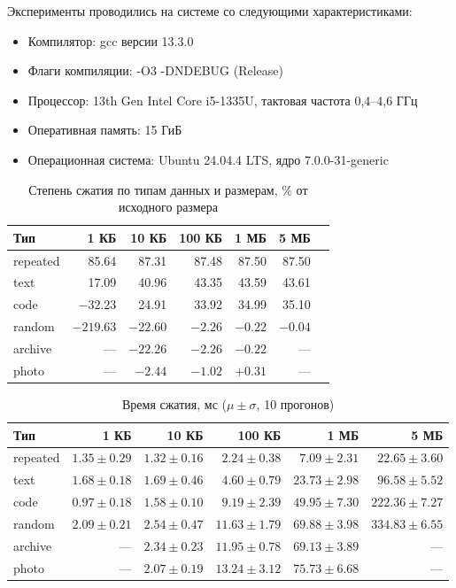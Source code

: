 \documentclass[a4paper]{article}
\begin{document}
Эксперименты проводились на системе со следующими характеристиками:

\begin{itemize}
    \item Компилятор: gcc версии 13.3.0
    \item Флаги компиляции: -O3 -DNDEBUG (Release)
    \item Процессор: 13th Gen Intel Core i5-1335U, тактовая частота 0,4--4,6 ГГц
    \item Оперативная память: 15 ГиБ
    \item Операционная система: Ubuntu 24.04.4 LTS, ядро 7.0.0-31-generic
\end{itemize}

\begin{table}[h]
\centering
\small
\caption{Степень сжатия по типам данных и размерам, \% от исходного размера}
\label{tab:ratio}
\begin{tabular}{lrrrrrr}
\toprule
Тип & 1 КБ & 10 КБ & 100 КБ & 1 МБ & 5 МБ \\
\midrule
repeated & 85.64 & 87.31 & 87.48 & 87.50 & 87.50 \\
text     & 17.09 & 40.96 & 43.35 & 43.59 & 43.61 \\
code     & $-32.23$ & 24.91 & 33.92 & 34.99 & 35.10 \\
random   & $-219.63$ & $-22.60$ & $-2.26$ & $-0.22$ & $-0.04$ \\
archive  & ---   & $-22.26$ & $-2.26$ & $-0.22$ & ---   \\
photo    & ---   & $-2.44$  & $-1.02$ & $+0.31$ & ---   \\
\bottomrule
\end{tabular}
\end{table}

\begin{table}[h]
\centering
\small
\caption{Время сжатия, мс ($\mu \pm \sigma$, 10 прогонов)}
\label{tab:compress}
\begin{tabular}{lrrrrr}
\toprule
Тип & 1 КБ & 10 КБ & 100 КБ & 1 МБ & 5 МБ \\
\midrule
repeated & $1.35 \pm 0.29$ & $1.32 \pm 0.16$ & $2.24 \pm 0.38$ & $7.09 \pm 2.31$ & $22.65 \pm 3.60$ \\
text     & $1.68 \pm 0.18$ & $1.69 \pm 0.46$ & $4.60 \pm 0.79$ & $23.73 \pm 2.98$ & $96.58 \pm 5.52$ \\
code     & $0.97 \pm 0.18$ & $1.58 \pm 0.10$ & $9.19 \pm 2.39$ & $49.95 \pm 7.30$ & $222.36 \pm 7.27$ \\
random   & $2.09 \pm 0.21$ & $2.54 \pm 0.47$ & $11.63 \pm 1.79$ & $69.88 \pm 3.98$ & $334.83 \pm 6.55$ \\
archive  & --- & $2.34 \pm 0.23$ & $11.95 \pm 0.78$ & $69.13 \pm 3.89$ & --- \\
photo    & --- & $2.07 \pm 0.19$ & $13.24 \pm 3.12$ & $75.73 \pm 6.68$ & --- \\
\bottomrule
\end{tabular}
\end{table}
\end{document}
